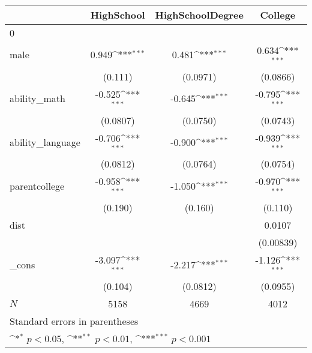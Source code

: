 {
\def\sym#1{\ifmmode^{#1}\else\(^{#1}\)\fi}
\begin{tabular}{l*{3}{c}}
\hline\hline
            &\multicolumn{1}{c}{HighSchool}&\multicolumn{1}{c}{HighSchoolDegree}&\multicolumn{1}{c}{College}\\
\hline
0           &                     &                     &                     \\
male        &       0.949\sym{***}&       0.481\sym{***}&       0.634\sym{***}\\
            &     (0.111)         &    (0.0971)         &    (0.0866)         \\
[1em]
ability\_math&      -0.525\sym{***}&      -0.645\sym{***}&      -0.795\sym{***}\\
            &    (0.0807)         &    (0.0750)         &    (0.0743)         \\
[1em]
ability\_language&      -0.706\sym{***}&      -0.900\sym{***}&      -0.939\sym{***}\\
            &    (0.0812)         &    (0.0764)         &    (0.0754)         \\
[1em]
parentcollege&      -0.958\sym{***}&      -1.050\sym{***}&      -0.970\sym{***}\\
            &     (0.190)         &     (0.160)         &     (0.110)         \\
[1em]
dist        &                     &                     &      0.0107         \\
            &                     &                     &   (0.00839)         \\
[1em]
\_cons      &      -3.097\sym{***}&      -2.217\sym{***}&      -1.126\sym{***}\\
            &     (0.104)         &    (0.0812)         &    (0.0955)         \\
\hline
\(N\)       &        5158         &        4669         &        4012         \\
\hline\hline
\multicolumn{4}{l}{\footnotesize Standard errors in parentheses}\\
\multicolumn{4}{l}{\footnotesize \sym{*} \(p<0.05\), \sym{**} \(p<0.01\), \sym{***} \(p<0.001\)}\\
\end{tabular}
}
